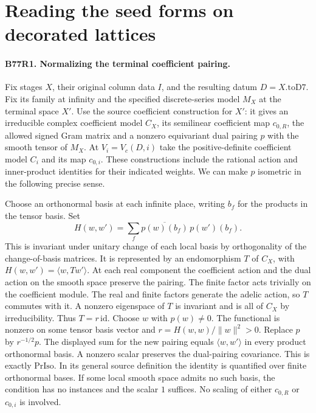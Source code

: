 \section{Reading the seed forms on decorated lattices}

\paragraph{B77R1. Normalizing the terminal coefficient pairing.}
Fix stages $X$, their original column data $I$, and the resulting
datum $D=X.\mathrm{toD7}$. Fix its family at infinity and the
specified discrete-series model $M_X$ at the terminal space $X'$.
Use the source coefficient construction for $X'$: it gives an
irreducible complex coefficient model $C_X$, its semilinear
coefficient map $c_{0,R}$, the allowed signed Gram matrix and a
nonzero equivariant dual pairing $p$ with the smooth tensor of
$M_X$. At $V_i=V_c(D,i)$ take the positive-definite coefficient
model $C_i$ and its map $c_{0,i}$. These constructions include
the rational action and inner-product identities for their indicated
weights. We can make $p$ isometric in the following precise sense.

Choose an orthonormal basis at each infinite place, writing $b_f$
for the products in the tensor basis. Set
\[
 H(w,w')=\sum_f\overline{p(w)(b_f)}\,p(w')(b_f).
\]
This is invariant under unitary change of each local basis by
orthogonality of the change-of-basis matrices. It is represented
by an endomorphism $T$ of $C_X$, with
$H(w,w')=\langle w,Tw'\rangle$. At each real component the
coefficient action and the dual action on the smooth space
preserve the pairing. The finite factor acts trivially on the
coefficient module. The real and finite factors generate the
adelic action, so $T$ commutes with it. A nonzero eigenspace of
$T$ is invariant and is all of $C_X$ by irreducibility. Thus
$T=r\,\mathrm{id}$. Choose $w$ with $p(w)\ne0$. The functional is nonzero
on some tensor basis vector and
$r=H(w,w)/\|w\|^2>0$. Replace $p$ by $r^{-1/2}p$. The displayed
sum for the new pairing equals $\langle w,w'\rangle$ in every
product orthonormal basis. A nonzero scalar preserves the
dual-pairing covariance. This is exactly $\mathrm{PrIso}$.
In its general source definition the identity is quantified over
finite orthonormal bases. If some local smooth space admits no
such basis, the condition has no instances and the scalar $1$
suffices. No scaling of either $c_{0,R}$ or $c_{0,i}$ is involved.

